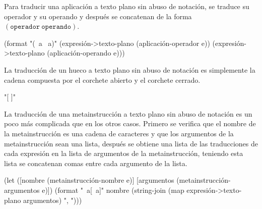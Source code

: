 \documentclass[letterpaper,twoside,openright,11pt]{book}
\begin{document}
Para traducir una aplicación a texto plano sin abuso de notación, se traduce su operador y su operando y después se concatenan de la forma \( (\mathtt{operador}\ \mathtt{operando}) \).

\nwenddocs{}\endmoddef
(format "(~a ~a)"
        (expresión->texto-plano (aplicación-operador e))
        (expresión->texto-plano (aplicación-operando e)))
\nwendcode{}\nwdocspar

La traducción de un hueco a texto plano sin abuso de notación es simplemente la cadena compuesta por el corchete abierto y el corchete cerrado.

\nwenddocs{}\endmoddef
"[ ]"
\nwendcode{}\nwdocspar

La traducción de una metainstrucción a texto plano sin abuso de notación es un poco más complicada que en los otros casos. Primero se verifica que el nombre de la metainstrucción es una cadena de caracteres y que los argumentos de la metainstrucción sean una lista, después se obtiene una lista de las traducciones de cada expresión en la lista de argumentos de la metainstrucción, teniendo esta lista se concatenan comas entre cada argumento de la lista.

\nwenddocs{}\endmoddef
(let ([nombre     (metainstrucción-nombre     e)]
      [argumentos (metainstrucción-argumentos e)])
  (format "~a[~a]"
              nombre
              (string-join (map expresión->texto-plano argumentos) ", ")))
\nwendcode{}\nwdocspar
\end{document}
